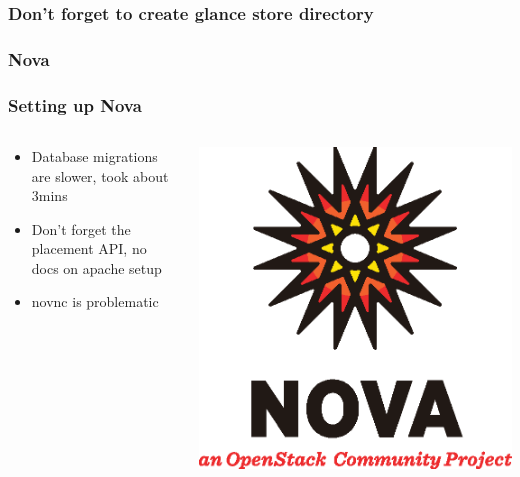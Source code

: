 \documentclass[aspectratio=169,11pt,hyperref={colorlinks=true}]{beamer}
\begin{document}
\begin{frame}
    \frametitle{Don't forget to create glance store directory}
    
\end{frame}

\subsubsection{Nova}
\begin{frame}
    \frametitle{Setting up Nova}
    \begin{columns}[T]
        \begin{column}{.48\textwidth}
            \begin{itemize}
                \item Database migrations are slower, took about 3mins
                \item Don't forget the placement API, no docs on apache setup
                \item novnc is problematic
            \end{itemize}
        \end{column}
        \begin{column}{.48\textwidth}
            \includegraphics[width=\textwidth]{mascots/nova.eps}
        \end{column}
    \end{columns}
\end{frame}
\end{document}
